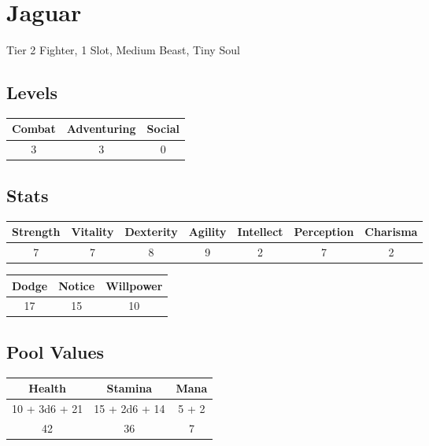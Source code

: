 \section{Jaguar}
Tier 2 Fighter, 1 Slot, Medium Beast, Tiny Soul


\subsection{Levels}
\begin{minipage}[H]{1\textwidth}
    \centering
    \begin{tabular}[c]{|c | c | c|}
        \hline
        Combat & Adventuring & Social\\
        \hline
        3 & 3 & 0\\
        \hline
    \end{tabular}
\end{minipage}

\subsection{Stats}
\begin{minipage}[H]{1\textwidth}
    \centering
    \begin{tabular}[c]{|c | c | c | c | c | c | c|}
        \hline
        Strength & Vitality & Dexterity & Agility & Intellect & Perception & Charisma\\
        \hline
        7 & 7 & 8 & 9 & 2 & 7 & 2\\
        \hline
    \end{tabular}
\end{minipage}
\bigbreak

\begin{minipage}[H]{1\textwidth}
    \centering
    \begin{tabular}[c]{|c | c | c|}
        \hline
        Dodge & Notice & Willpower\\
        \hline
        17 & 15 & 10\\
        \hline
    \end{tabular}
\end{minipage}

\subsection{Pool Values}
\bigbreak
\begin{minipage}[H]{1\textwidth}
    \centering
    \begin{tabular}[c]{|c | c | c|}
        \hline
        Health & Stamina & Mana\\
        \hline
        10 + 3d6 + 21 & 15 + 2d6 + 14 & 5 + 2 \\
        42 & 36 & 7\\
        \hline
    \end{tabular}
\end{minipage}
\noindent

